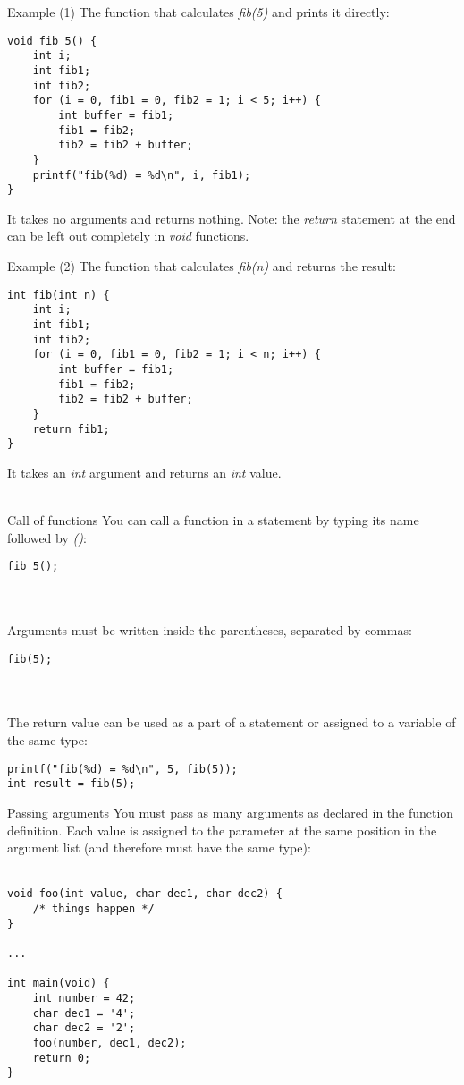 \begin{frame}[fragile]{Example (1)}
	The function that calculates \textit{fib(5)} and prints it directly:
	\begin{lstlisting}
void fib_5() {
	int i;
	int fib1;
	int fib2;
	for (i = 0, fib1 = 0, fib2 = 1; i < 5; i++) {
		int buffer = fib1;
		fib1 = fib2;
		fib2 = fib2 + buffer;
	}
	printf("fib(%d) = %d\n", i, fib1);
}
\end{lstlisting}
	It takes no arguments and returns nothing.
	Note: the \textit{return} statement at the end can be left out completely in \textit{void} functions.
\end{frame}
\begin{frame}[fragile]{Example (2)}
	The function that calculates \textit{fib(n)} and returns the result:
	\begin{lstlisting}
int fib(int n) {
	int i;
	int fib1;
	int fib2;
	for (i = 0, fib1 = 0, fib2 = 1; i < n; i++) {
		int buffer = fib1;
		fib1 = fib2;
		fib2 = fib2 + buffer;
	}
	return fib1;
}
\end{lstlisting}
		It takes an \textit{int} argument and returns an \textit{int} value.\\\ 
\end{frame}
\begin{frame}[fragile]{Call of functions}
	You can call a function in a statement by typing its name followed by \textit{()}:
	\begin{lstlisting}[numbers=none]
fib_5();
\end{lstlisting} \ \\ \ \\
	Arguments must be written inside the parentheses, separated by commas:
	\begin{lstlisting}[numbers=none]
fib(5);
\end{lstlisting} \ \\ \ \\
	The return value can be used as a part of a statement or assigned to a variable of the same type:
	\begin{lstlisting}[numbers=none]
printf("fib(%d) = %d\n", 5, fib(5));
int result = fib(5);
\end{lstlisting}
\end{frame}
\begin{frame}[fragile]{Passing arguments}
	You must pass as many arguments as declared in the function definition. Each value is assigned to the parameter at the same position in the argument list (and therefore must have the same type): \ \\ \ \\
	\begin{lstlisting}
void foo(int value, char dec1, char dec2) {
	/* things happen */
}

...

int main(void) {
	int number = 42;
	char dec1 = '4';
	char dec2 = '2';
	foo(number, dec1, dec2);
	return 0;
}
\end{lstlisting}
\end{frame}

